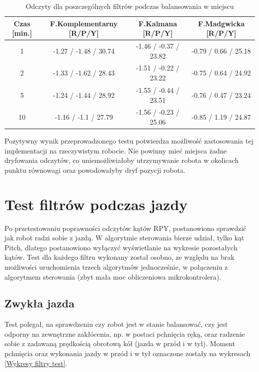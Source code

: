 \begin{table}[h!]
    \centering
    \caption{Odczyty dla poszczególnych filtrów podczas balansowania w miejscu}
    \begin{tabular}{|c|c|c|c|}
        \hline
        Czas [min.] & F.Komplementarny [R/P/Y] & F.Kalmana [R/P/Y] & F.Madgwicka [R/P/Y] \\
        \hline
        1 & -1.27 / -1.48 / 30.74 & -1.46 / -0.37 / 23.82 & -0.79 / 0.66 / 25.18 \\
        \hline
        2 & -1.33 / -1.62 / 28.43 & -1.51 / -0.22 / 23.22 & -0.75 / 0.64 / 24.92  \\
        \hline
        5 & -1.24 / -1.44 / 28.92 & -1.55 / -0.44 / 23.51 & -0.76 / 0.47 / 23.24  \\
        \hline
        10 & -1.16 / -1.1 / 27.79 & -1.56 / -0.23 / 25.06 & -0.85 / 1.19 / 24.87  \\
        \hline
    \end{tabular}
	\label{Tabela ruch}
\end{table}

Pozytywny wynik przeprowadzonego testu potwierdza możliwość zastosowania tej implementacji na rzeczywistym robocie. Nie powinny mieć miejsca żadne dryfowania odczytów, co uniemożliwiałoby utrzymywanie robota w okolicach punktu równowagi oraz powodowałyby dryf pozycji robota.

\section{Test filtrów podczas jazdy}

Po przetestowaniu poprawności odczytów kątów RPY, postanowiono sprawdzić jak robot radzi sobie z jazdą. W algorytmie sterowania bierze udział, tylko kąt Pitch, dlatego postanowiono wyłączyć wyświetlanie na wykresie pozostałych kątów. Test dla każdego filtru wykonany został osobno, ze względu na brak możliwości uruchomienia trzech algorytmów jednocześnie, w połączeniu z algorytmem sterowania (zbyt mała moc obliczeniowa mikrokontrolera). 

\subsection{Zwykła jazda}

Test polegał, na sprawdzeniu czy robot jest w stanie balansować, czy jest odporny na zewnętrzne zakłócenia, np. w postaci pchnięcia ręką, oraz radzenie sobie z zadawaną prędkością obrotową kół (jazda w przód i w tył). Moment pchnięcia oraz wykonania jazdy w przód i w tył oznaczone zostały na wykresach \ref{Wykresy filtry test}.

